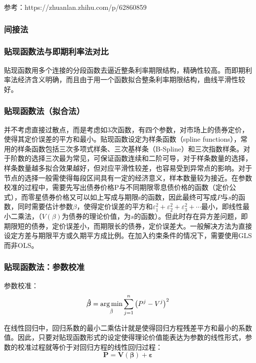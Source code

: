 \documentclass[11pt]{article}
\begin{document}
参考：https://zhuanlan.zhihu.com/p/62860859

\subsubsection{间接法}

\subsubsection*{贴现函数法与即期利率法对比}

贴现函数用多个连接的分段函数去逼近整条利率期限结构，精确性较高。而即期利率法经济含义明确，而且由于用一个函数拟合整条利率期限结构，曲线平滑性较好。

\subsubsection{贴现函数法（拟合法）}

并不考虑直接过散点，而是考虑如3次函数，有四个参数，对市场上的债券定价，使得其定价误差的平方和最小。贴现函数设定为样条函数（spline functions），常用的样条函数包括三次多项式样条、三次基样条（B-Spline）和三次指数样条。对于阶数的选择三次最为常见，可保证函数连续和二阶可导，对于样条数量的选择，样条数量越多拟合效果越好，但对应平滑性较差，也容易受到异常点的影响。对于节点的选择一般需使得每段区间具有一定的经济意义，样本数量较为接近。在参数校准的过程中，需要先写出债券价格P与不同期限零息债价格的函数（定价公式），而零星债券价格又可以如上写成与期限s的函数，因此最终可写成$P$与$s$的函数，同时需要估计参数$\beta$，使得定价误差的平方和$\varepsilon_1^2+\varepsilon_2^2+\varepsilon_3^2+⋯$最小，即线性最小二乘法，（$V(\beta)$为债券的理论价值，为$s$的函数）。但此时存在异方差问题，即期限短的债券，定价误差小，而期限长的债券，定价误差大。一般解决方法为直接设定方差与期限平方或久期平方成比例。在加入约束条件的情况下，需要使用GLS而非OLS。

\subsubsection*{贴现函数法：参数校准}

参数校准：
\begin{equation*}
	\bm{\hat{\beta}} = \operatorname*{arg\,min}_{\hat{\beta}} \sum^n_{j=1}\left(P^j - V^j\right)^2
\end{equation*}

在线性回归中，回归系数的最小二乘估计就是使得回归方程残差平方和最小的系数值。因此，只要对贴现函数形式的设定使得理论价值能表达为参数的线性形式，参数的校准过程就等价于对回归方程的线性回归过程：
\begin{equation*}
	\mathbf{P=V(\bm{\beta})+\bm{\varepsilon}}
\end{equation*}
\end{document}
